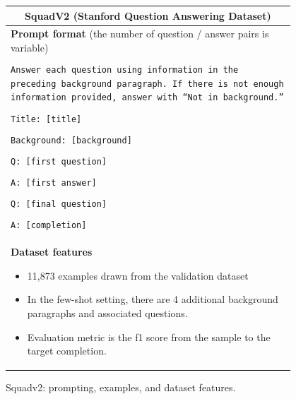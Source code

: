 \documentclass{article}
\begin{document}
\begin{figure}[p]
    \centering \small
    \begin{tabular}{p{0.95\linewidth}}
    \toprule
    \multicolumn{1}{c}{\textbf{SquadV2 (Stanford Question Answering Dataset)}} \\

    \midrule
    \textbf{Prompt format} {(the number of question / answer pairs is variable)}\\\\

    \texttt{Answer each question using information in the preceding background paragraph. If there is not enough information provided, answer with ``Not in background.''} \\\\
    \texttt{Title: [title]} \\\\
    \texttt{Background: [background]} \\\\
    \texttt{Q: [first question]} \\\\
    \texttt{A: [first answer]} \\\\
    \texttt{Q: [final question]} \\\\
    \texttt{A: [completion]} \\

    \midrule
    \textbf{Dataset features}
    \begin{itemize}
        \item 11,873 examples drawn from the validation dataset
        \item In the few-shot setting, there are 4 additional background paragraphs and associated questions.
        \item Evaluation metric is the f1 score from the sample to the target completion.
    \end{itemize} \\

    \bottomrule
    \end{tabular}
    \caption{Squadv2: prompting, examples, and dataset features.}
    \label{tab:prompt-squad}
\end{figure}
\end{document}
